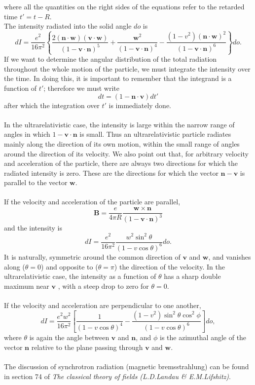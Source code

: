 where all the quantities on the right sides of the equations refer to the retarded time $t' = t - R$. \\
The intensity radiated into the solid angle $do$ is
\[dI = \frac{e^2}{16\pi^2} \left\{ \frac{2(\bm{n}\cdot\bm{w})(\bm{v}\cdot\bm{w})}{(1-\bm{v}\cdot\bm{n})^5} + \frac{\bm{w}^2}{(1-\bm{v}\cdot\bm{n})^4} - \frac{(1-v^2)(\bm{n}\cdot\bm{w})^2}{(1-\bm{v}\cdot\bm{n})^6}\right\}do.\]
If we want to determine the angular distribution of the total radiation throughout the whole motion of the particle, we must integrate the intensity over the time. In doing this, it
is important to remember that the integrand is a function of $t'$; therefore we must write
\[dt = (1-\bm{n}\cdot\bm{v})dt'\]
after which the integration over $t'$ is immediately done.\\ \\
In the ultrarelativistic case, the intensity is large within the narrow range of angles in which $1-\bm{v}\cdot\bm{n}$ is small. Thus an ultrarelativistic particle radiates mainly along the direction of its own motion, within the small range  of angles around the direction of its velocity. We also point out that, for arbitrary velocity and acceleration of the particle, there are always two directions for which the radiated intensity is zero. These are the directions for
which the vector $\bm{n}-\bm{v}$ is parallel to the vector $\bm{w}$.\\ \\
If the velocity and acceleration of the particle are parallel,
\[\bm{B} = \frac{e}{4\pi R} \frac{\bm{w} \times \bm{n}}{(1-\bm{v}\cdot\bm{n})^3} \]
and the intensity is
\[dI = \frac{e^2}{16\pi^2} \frac{w^2 \sin^2 \theta}{(1-v\cos\theta)^6} do.\]
It is naturally, symmetric around the common direction of $\bm{v}$ and $\bm{w}$, and vanishes along ($\theta=0$) and opposite to ($\theta = \pi$) the direction of the velocity. In the ultrarelativistic case, the intensity as a function of $\theta$ has a sharp double maximum near $\bm{v}$ , with a steep drop to zero for $\theta = 0$.
\\ \\
If the velocity and acceleration are perpendicular to one another,
\[dI = \frac{e^2 w^2}{16\pi^2} \left[ \frac{1}{(1-v\cos\theta)^4} - \frac{(1-v^2)\sin^2\theta \cos^2\phi}{(1-v\cos\theta)^6} \right]do,\]
where $\theta$ is again the angle between $\bm{v}$ and $\bm{n}$, and $\phi$ is the azimuthal angle of the vector $\bm{n}$ relative to the plane passing through $\bm{v}$ and $\bm{w}$.
\\ \\
The discussion of synchrotron radiation (magnetic bremsstrahlung) can be found in section 74 of \emph{The classical theory of fields (L.D.Landau \& E.M.Lifshitz)}.

